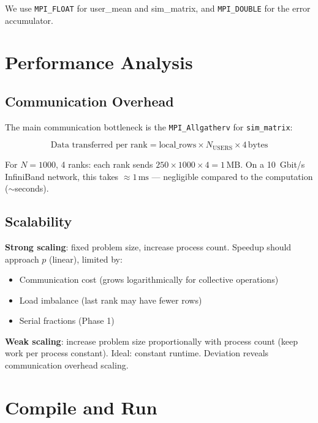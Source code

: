 \documentclass[12pt,a4paper]{article}
\begin{document}
We use \texttt{MPI\_FLOAT} for user\_mean and sim\_matrix, and
\texttt{MPI\_DOUBLE} for the error accumulator.

\section{Performance Analysis}

\subsection{Communication Overhead}

The main communication bottleneck is the \texttt{MPI\_Allgatherv} for
\texttt{sim\_matrix}:

\[
\text{Data transferred per rank} = \text{local\_rows} \times N_{\text{USERS}} \times 4\,\text{bytes}
\]

For $N = 1000$, 4 ranks: each rank sends $250 \times 1000 \times 4 = 1\,\text{MB}$.
On a 10~Gbit/s InfiniBand network, this takes $\approx 1\,\text{ms}$ — negligible
compared to the computation ($\sim$seconds).

\subsection{Scalability}

\textbf{Strong scaling}: fixed problem size, increase process count.
Speedup should approach $p$ (linear), limited by:
\begin{itemize}
    \item Communication cost (grows logarithmically for collective operations)
    \item Load imbalance (last rank may have fewer rows)
    \item Serial fractions (Phase 1)
\end{itemize}

\textbf{Weak scaling}: increase problem size proportionally with process count
(keep work per process constant).  Ideal: constant runtime.  Deviation
reveals communication overhead scaling.

\section{Compile and Run}
\end{document}
